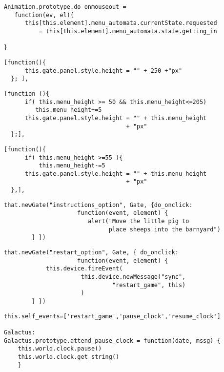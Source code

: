 \begin{lstlisting}[caption=Clase Button, label={lst:code5123}]
Animation.prototype.do_onmouseout = 
   function(ev, el){
      this[this.element].menu_automata.currentState.requested 
          = this[this.element].menu_automata.state.getting_in

}
\end{lstlisting}


\begin{lstlisting}[caption=Estado out, label={lst:code5211}]
  [function(){
      this.gate.panel.style.height = "" + 250 +"px" 
  }; ],
\end{lstlisting}


\begin{lstlisting}[caption=Estado getting\_out, label={lst:code5212}]
  [function (){
      if( this.menu_height >= 50 && this.menu_height<=205)
         this.menu_height+=5
      this.gate.panel.style.height = "" + this.menu_height 
                                   + "px"
  };],
\end{lstlisting}


\begin{lstlisting}[caption=Estado getting\_in, label={lst:code5213}]
  [function(){
      if( this.menu_height >=55 ){         
          this.menu_height-=5
      this.gate.panel.style.height = "" + this.menu_height 
                                   + "px"
  },],
\end{lstlisting}

\begin{lstlisting}[caption=Instructions\_option Gate, label={lst:code5221}]
that.newGate("instructions_option", Gate, {do_onclick: 
                     function(event, element) {
                        alert("Move the little pig to
                              place sheeps into the barnyard")
        } })
\end{lstlisting}

\begin{lstlisting}[caption=restart\_option, label={lst:code5222}]
 that.newGate("restart_option", Gate, { do_onclick: 
                     function(event, element) {
            this.device.fireEvent(
                      this.device.newMessage("sync", 
                               "restart_game", this)
                      )
        } })
\end{lstlisting}


\begin{lstlisting}[caption=variable self\_events, label={lst:code5231}]
this.self_events=['restart_game','pause_clock','resume_clock']

Galactus:
Galactus.prototype.attend_pause_clock = function(date, mssg) {
    this.world.clock.pause()
    this.world.clock.get_string()
    }
\end{lstlisting}

